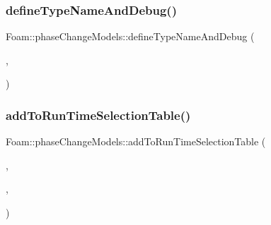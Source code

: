 \mbox{\label{namespaceFoam_1_1phaseChangeModels_a2ab6ce8506ae017d6165eeb5d1016cc7}} 
\subsubsection{\texorpdfstring{define\+Type\+Name\+And\+Debug()}{defineTypeNameAndDebug()}\hspace{0.1cm}{\footnotesize\ttfamily [2/2]}}
{\footnotesize\ttfamily Foam\+::phase\+Change\+Models\+::define\+Type\+Name\+And\+Debug (\begin{DoxyParamCaption}\item[{\hyperlink{classFoam_1_1phaseChangeModels_1_1heatDrivenPhaseChange}{heat\+Driven\+Phase\+Change}}]{,  }\item[{0}]{ }\end{DoxyParamCaption})}

\mbox{\label{namespaceFoam_1_1phaseChangeModels_a6e2a1715c7ec5a03843dda857452e83a}} 
\subsubsection{\texorpdfstring{add\+To\+Run\+Time\+Selection\+Table()}{addToRunTimeSelectionTable()}\hspace{0.1cm}{\footnotesize\ttfamily [2/2]}}
{\footnotesize\ttfamily Foam\+::phase\+Change\+Models\+::add\+To\+Run\+Time\+Selection\+Table (\begin{DoxyParamCaption}\item[{\hyperlink{classFoam_1_1phaseChangeModel}{phase\+Change\+Model}}]{,  }\item[{\hyperlink{classFoam_1_1phaseChangeModels_1_1heatDrivenPhaseChange}{heat\+Driven\+Phase\+Change}}]{,  }\item[{phase\+Change\+Models}]{ }\end{DoxyParamCaption})}

